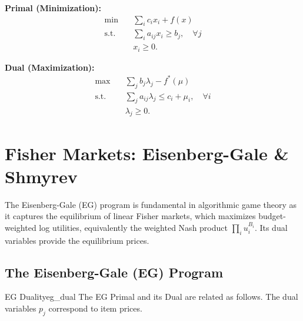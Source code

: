 \documentclass[11pt, a4paper]{article}
\begin{document}
\noindent
\begin{minipage}[t]{0.48\textwidth}
    \textbf{Primal (Minimization):}
    \begin{align*}
        \min \quad & \sum_{i} c_i x_i + f(x) \\
        \text{s.t.} \quad & \sum_{i} a_{ij}x_i \ge b_j, \quad \forall j \\
                          & x_i \ge 0.
    \end{align*} 
\end{minipage}
\hfill \vrule{} \hfill
\begin{minipage}[t]{0.48\textwidth}
    \textbf{Dual (Maximization):}
    \begin{align*}
        \max \quad & \sum_{j} b_j \lambda_j - f^*(\mu) \\
        \text{s.t.} \quad & \sum_{j} a_{ij}\lambda_j \le c_i + \mu_i, \quad \forall i \\
                          & \lambda_j \ge 0.
    \end{align*}
\end{minipage}

\section{Fisher Markets: Eisenberg-Gale \& Shmyrev}

The Eisenberg-Gale (EG) program is fundamental in algorithmic game theory as it captures the equilibrium of linear Fisher markets, which maximizes budget-weighted log utilities, equivalently the weighted Nash product $\prod_i u_i^{B_i}$. Its dual variables provide the equilibrium prices.

\subsection{The Eisenberg-Gale (EG) Program}

\begin{lemma}{EG Duality}{eg_dual}
    The EG Primal and its Dual are related as follows. The dual variables $p_j$ correspond to item prices.
\end{lemma}
\end{document}
